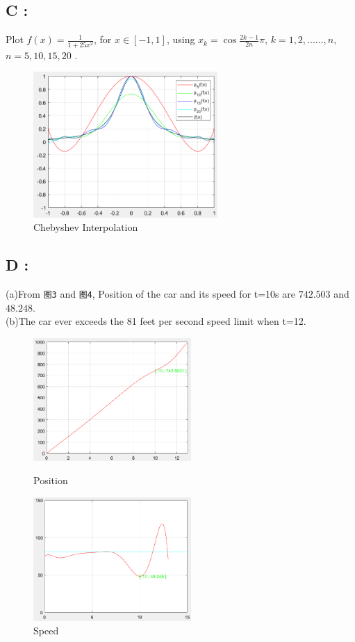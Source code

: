 \documentclass{ctexart}
\begin{document}
\subsection*{C :}
\begin{flushleft}
  Plot $f(x)=\frac{1}{1+25x^2}$, for $x\in[-1,1]$, using $x_k=\cos{\frac{2k-1}{2n}\pi}$, $k=1,2,......,n$, $n=5,10,15,20$ .

  \begin{figure}[H]
  \centering
    \centering
    \includegraphics[width=7cm]{2}
    \caption{Chebyshev Interpolation}
  \end{figure}
\end{flushleft}

\subsection*{D :}
\begin{flushleft}
  (a)From \verb|图3| and \verb|图4|, Position of the car and its speed for t=10s are $742.503$ and $48.248$. \\
  (b)The car ever exceeds the 81 feet per second speed limit when t=12. \\
  \begin{figure}[H]
    \centering
    \begin{minipage}[t]{0.48\textwidth}
      \centering
      \includegraphics[width=6cm]{3}
      \caption{Position}
    \end{minipage}
    \begin{minipage}[t]{0.48\textwidth}
      \centering
      \includegraphics[width=6cm]{4}
      \caption{Speed}
    \end{minipage}
  \end{figure}    
\end{flushleft}
\end{document}
